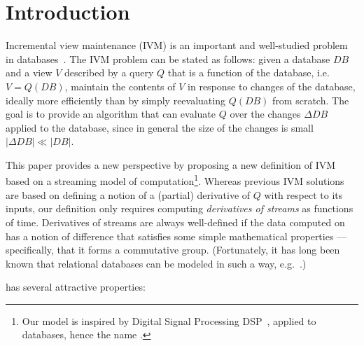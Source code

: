 \section{Introduction}\label{sec:introduction}

Incremental view maintenance (IVM) is an important and well-studied problem in
databases~\cite{gupta-idb95}.  The IVM problem can be stated as follows: given a database $DB$ and
a view $V$ described by a query $Q$ that is a function of the database, i.e. $V = Q(DB)$,
maintain the contents of $V$ in response to changes of the database,
ideally more efficiently than by simply reevaluating $Q(DB)$ from scratch.  The goal is
to provide an algorithm that can evaluate $Q$ over the changes $\Delta DB$ applied
to the database, since in general the size of the changes is small $|\Delta DB| \ll |DB|$.

This paper provides a new perspective by proposing a new definition
of IVM based on a streaming model of computation\footnote{Our model is inspired by Digital Signal
Processing DSP~\cite{rabiner-book75}, applied to databases, hence the name \dbsp.}.  Whereas previous
IVM solutions are based on defining a notion of a (partial) derivative of $Q$ with respect to its inputs,
our definition only requires computing \emph{derivatives of streams} as functions of time.
Derivatives of streams are always well-defined if the data computed on has a notion of difference
that satisfies some simple mathematical properties --- specifically, that it forms a commutative
group.  (Fortunately, it has long been known that relational databases can be modeled
in such a way, e.g.~\cite{green-pods07, koch-pods10}.)

\dbsp has several attractive properties:

